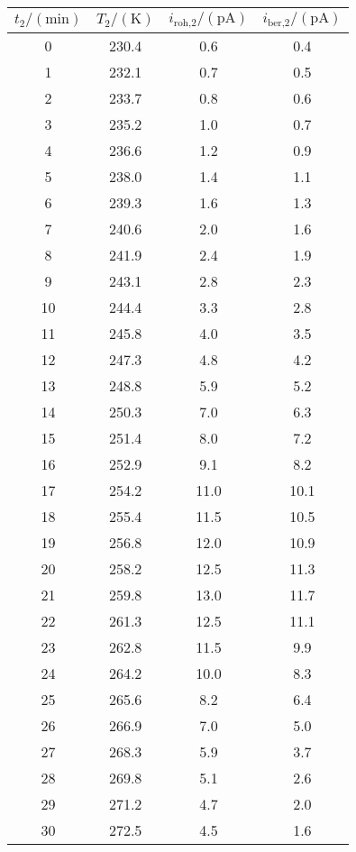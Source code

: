 \label{tab:tabData2_1}
	\begin{tabular}{S[table-format=2.0]S[table-format=3.1]S[table-format=2.1]S[table-format=2.1]}
		\toprule
		{$t_\text{2}/(\si{\minute})$} & {$T_\text{2}/(\si{\kelvin})$} & {$i_\text{roh,2}/(\si{\pico\ampere})$} & {$i_\text{ber,2}/(\si{\pico\ampere})$} \\
		 & 230.4 & 0.6 & 0.4 \\
		 1 & 232.1 & 0.7 & 0.5 \\
		 2 & 233.7 & 0.8 & 0.6 \\
		 3 & 235.2 & 1.0 & 0.7 \\
		 4 & 236.6 & 1.2 & 0.9 \\
		 5 & 238.0 & 1.4 & 1.1 \\
		 6 & 239.3 & 1.6 & 1.3 \\
		 7 & 240.6 & 2.0 & 1.6 \\
		 8 & 241.9 & 2.4 & 1.9 \\
		 9 & 243.1 & 2.8 & 2.3 \\
		10 & 244.4 & 3.3 & 2.8 \\
		11 & 245.8 & 4.0 & 3.5 \\
		12 & 247.3 & 4.8 & 4.2 \\
		13 & 248.8 & 5.9 & 5.2 \\
		14 & 250.3 & 7.0 & 6.3 \\
		15 & 251.4 & 8.0 & 7.2 \\
		16 & 252.9 & 9.1 & 8.2 \\
		17 & 254.2 & 11.0 & 10.1 \\
		18 & 255.4 & 11.5 & 10.5 \\
		19 & 256.8 & 12.0 & 10.9 \\
		20 & 258.2 & 12.5 & 11.3 \\
		21 & 259.8 & 13.0 & 11.7 \\
		22 & 261.3 & 12.5 & 11.1 \\
		23 & 262.8 & 11.5 & 9.9 \\
		24 & 264.2 & 10.0 & 8.3 \\
		25 & 265.6 & 8.2 & 6.4 \\
		26 & 266.9 & 7.0 & 5.0 \\
		27 & 268.3 & 5.9 & 3.7 \\
		28 & 269.8 & 5.1 & 2.6 \\
		29 & 271.2 & 4.7 & 2.0 \\
		30 & 272.5 & 4.5 & 1.6 \\
		\bottomrule
	\end{tabular}

